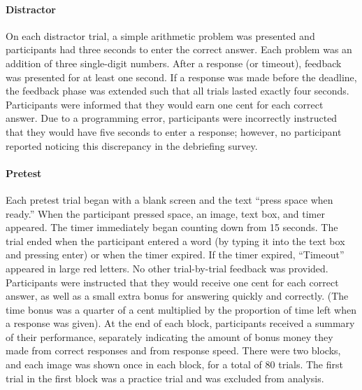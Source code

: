 \paragraph{Distractor} On each distractor trial, a simple arithmetic problem was presented and participants had three seconds to enter the correct answer. Each problem was an addition of three single-digit numbers. After a response (or timeout), feedback was presented for at least one second. If a response was made before the deadline, the feedback phase was extended such that all trials lasted exactly four seconds. Participants were informed that they would earn one cent for each correct answer. Due to a programming error, participants were incorrectly instructed that they would have five seconds to enter a response; however, no participant reported noticing this discrepancy in the debriefing survey.

\paragraph{Pretest} Each pretest trial began with a blank screen and the text ``press space when ready.'' When the participant pressed space, an image, text box, and timer appeared. The timer immediately began counting down from 15 seconds. The trial ended when the participant entered a word (by typing it into the text box and pressing enter) or when the timer expired. If the timer expired, ``Timeout'' appeared in large red letters. No other trial-by-trial feedback was provided. Participants were instructed that they would receive one cent for each correct answer, as well as a small extra bonus for answering quickly and correctly. (The time bonus was a quarter of a cent multiplied by the proportion of time left when a response was given). At the end of each block, participants received a summary of their performance, separately indicating the amount of bonus money they made from correct responses and from response speed. There were two blocks, and each image was shown once in each block, for a total of 80 trials. The first trial in the first block was a practice trial and was excluded from analysis.


